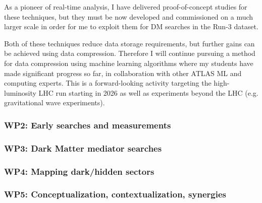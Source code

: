 \documentclass[11pt,a4paper]{article}
\begin{document}
As a pioneer of real-time analysis, I have delivered proof-of-concept studies for these techniques, but they must be now developed and commissioned on a much larger scale in order for me to exploit them for DM searches in the Run-3 dataset. 


Both of these techniques reduce data storage requirements, but further gains can be achieved using data compression. Therefore I will continue pursuing a method for data compression using machine learning algorithms where my students have made significant progress so far, in collaboration with other ATLAS ML and computing experts. This is a forward-looking activity targeting the high-luminosity LHC run starting in 2026 as well as experiments beyond the LHC (e.g. gravitational wave experiments).

\subsubsection*{WP2: Early searches and measurements}

\subsubsection*{WP3: Dark Matter mediator searches}

\subsubsection*{WP4: Mapping dark/hidden sectors}

\subsubsection*{WP5: Conceptualization, contextualization, synergies}

\end{document}

